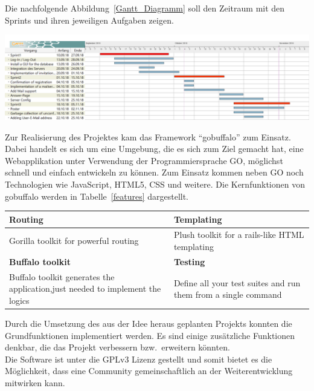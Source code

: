 \documentclass[landscape,a0paper,fontscale=0.35]{baposter} %
\begin{document}
\begin{poster}
{	Die nachfolgende Abbildung~\ref{Gantt_Diagramm} soll den Zeitraum mit den Sprints und ihren jeweiligen Aufgaben zeigen.
	\begin{center}
		\includegraphics[width=0.7\linewidth]{GanttDiagramm.PNG}
		\label{Gantt_Diagramm}
	\end{center}
}


{
	Zur Realisierung des Projektes kam das Framework \enquote{gobuffalo} zum Einsatz. Dabei handelt es sich um eine Umgebung, die es sich zum Ziel gemacht hat, eine Webapplikation unter Verwendung der Programmiersprache GO, möglichst schnell und einfach entwickeln zu können. Zum Einsatz kommen neben GO noch Technologien wie JavaScript, HTML5, CSS und weitere. Die Kernfunktionen von gobuffalo werden in Tabelle~\ref{features} dargestellt.
	\begin{center}
		\begin{tabular}{p{4cm}p{4cm}}
			\toprule
			\textbf{Routing} & \textbf{Templating} \\
			\midrule
			Gorilla toolkit for powerful routing & Plush toolkit for a rails-like HTML templating \\
			\midrule
			\textbf{Buffalo toolkit} & \textbf{Testing} \\
			\midrule
			Buffalo toolkit generates the application,\newline just needed to implement the logics & Define all your test suites and run them from a single command\\
			\bottomrule
		\end{tabular}
	\label{features}
	\end{center}
}


{
	Durch die Umsetzung des aus der Idee heraus geplanten Projekts konnten die Grundfunktionen implementiert werden. Es sind einige zusätzliche Funktionen denkbar, die das Projekt verbessern bzw.\ erweitern könnten.\\
	Die Software ist unter die GPLv3 Lizenz gestellt und somit bietet es die Möglichkeit, dass eine Community gemeinschaftlich an der Weiterentwicklung mitwirken kann.

}
\end{poster}
\end{document}
